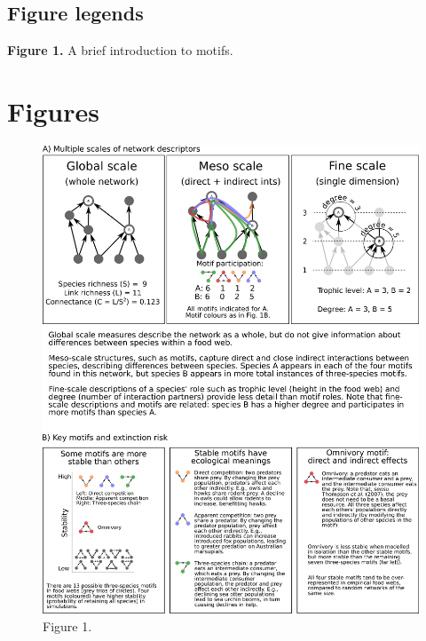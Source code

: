 \documentclass[12pt]{article}
\begin{document}
\clearpage

\begin{spacing}{2.0}
\section*{Figure legends}

        \textbf{Figure 1.} A brief introduction to motifs.

    \vspace{24pt}


\end{spacing}

\clearpage

\section*{Figures}


    \begin{figure}[h!]
        \includegraphics[width=.9\textwidth]{figures/motifs_box.eps}
        \caption{Figure 1.}
        \label{motifs}
    \end{figure}
\end{document}
